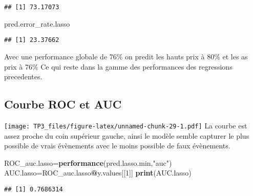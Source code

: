 \documentclass[
]{article}
\newenvironment{Shaded}{\begin{snugshade}}{\end{snugshade}}
\newcommand{\DecValTok}[1]{\textcolor[rgb]{0.00,0.00,0.81}{#1}}
\newcommand{\KeywordTok}[1]{\textcolor[rgb]{0.13,0.29,0.53}{\textbf{#1}}}
\newcommand{\NormalTok}[1]{#1}
\newcommand{\OperatorTok}[1]{\textcolor[rgb]{0.81,0.36,0.00}{\textbf{#1}}}
\newcommand{\StringTok}[1]{\textcolor[rgb]{0.31,0.60,0.02}{#1}}
\begin{document}
\begin{verbatim}
## [1] 73.17073
\end{verbatim}

\begin{Shaded}
\begin{Highlighting}[]
\NormalTok{pred.error_rate.lasso}
\end{Highlighting}
\end{Shaded}

\begin{verbatim}
## [1] 23.37662
\end{verbatim}

Avec une performance globale de 76\% on predit les hauts prix à 80\% et
les as prix à 76\% Ce qui reste dans la gamme des performances des
regressions precedentes.

\hypertarget{courbe-roc-et-auc-1}{%
\subsection{Courbe ROC et AUC}\label{courbe-roc-et-auc-1}}

\begin{Shaded}
\end{Shaded}

\texttt{[image: TP3\_files/figure-latex/unnamed-chunk-29-1.pdf]} La
courbe est assez proche du coin supérieur gauche, ainsi le modèle semble
capturer le plus possible de vrais évènements avec le moins possible de
faux évènements.

\begin{Shaded}
\begin{Highlighting}[]
\NormalTok{ROC_auc.lasso=}\KeywordTok{performance}\NormalTok{(pred.lasso.min,}\StringTok{"auc"}\NormalTok{)}
\NormalTok{AUC.lasso=ROC_auc.lasso}\OperatorTok{@}\NormalTok{y.values[[}\DecValTok{1}\NormalTok{]]}
\KeywordTok{print}\NormalTok{(AUC.lasso)}
\end{Highlighting}
\end{Shaded}

\begin{verbatim}
## [1] 0.7686314
\end{verbatim}
\end{document}
